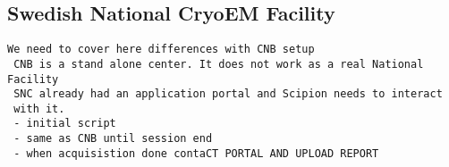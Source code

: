 
\subsection{Swedish National CryoEM Facility}

\begin{verbatim}
We need to cover here differences with CNB setup
 CNB is a stand alone center. It does not work as a real National Facility
 SNC already had an application portal and Scipion needs to interact
 with it. 
 - initial script
 - same as CNB until session end
 - when acquisistion done contaCT PORTAL AND UPLOAD REPORT
\end{verbatim}

